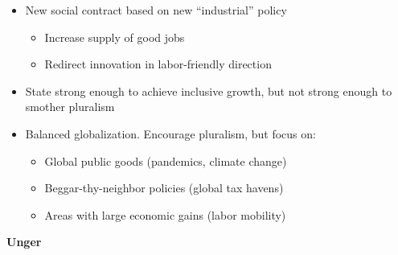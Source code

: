 \begin{itemize}
  \begin{itemize}
  \tightlist
  \item
    New social contract based on new ``industrial'' policy

    \begin{itemize}
    \tightlist
    \item
      Increase supply of good jobs
    \item
      Redirect innovation in labor-friendly direction
    \end{itemize}
  \item
    State strong enough to achieve inclusive growth, but not strong
    enough to smother pluralism
  \item
    Balanced globalization. Encourage pluralism, but focus on:

    \begin{itemize}
    \tightlist
    \item
      Global public goods (pandemics, climate change)
    \item
      Beggar-thy-neighbor policies (global tax havens)
    \item
      Areas with large economic gains (labor mobility)
    \end{itemize}
  \end{itemize}
\end{itemize}

\textbf{Unger}

